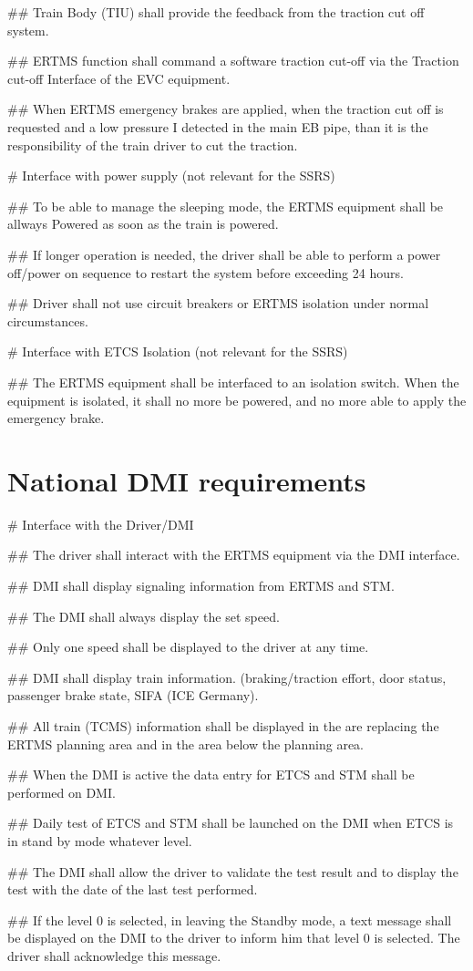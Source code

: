 \documentclass{template/openetcs_article}
\begin{document}
\begin{easylist}
## Train Body (TIU) shall provide the feedback from the traction cut off system.

## ERTMS function shall command a software traction cut-off via the Traction cut-off Interface of the EVC equipment.

## When ERTMS emergency brakes are applied, when the traction cut off is requested and a low pressure I detected in the main EB pipe, than it is the responsibility of the train driver to cut the traction.

# Interface with power supply (not relevant for the SSRS)

## To be able to manage the sleeping mode, the ERTMS equipment shall be allways Powered as soon as the train is powered.

## If longer operation is needed, the driver shall be able to perform a power off/power on sequence to restart the system before exceeding 24 hours.

## Driver shall not use circuit breakers or ERTMS isolation under normal circumstances.

# Interface with ETCS Isolation (not relevant for the SSRS)

## The ERTMS equipment shall be interfaced to an isolation switch. When the equipment is isolated, it shall no more be powered, and no more able to apply the emergency brake.

\end{easylist}



\section{National DMI requirements}
\begin{easylist}
# Interface with the Driver/DMI

## The driver shall interact with the ERTMS equipment via the DMI interface.

## DMI shall display signaling information from ERTMS and STM.

## The DMI shall always display the set speed.

## Only one speed shall be displayed to the driver at any time.

## DMI shall display train information. (braking/traction effort, door status, passenger brake state, SIFA (ICE Germany).

## All train (TCMS) information shall be displayed in the are replacing the ERTMS planning area and in the area below the planning area.

## When the DMI is active the data entry for ETCS and STM shall be performed on DMI.

## Daily test of ETCS and STM shall be launched on the DMI when ETCS is in stand by mode whatever level.

## The DMI shall allow the driver to validate the test result and to display the test with the date of the last test performed.

## If the level 0 is selected, in leaving the Standby mode, a text message shall be displayed on the DMI to the driver to inform him that level 0 is selected. The driver shall acknowledge this message.
\end{easylist}
\end{document}
